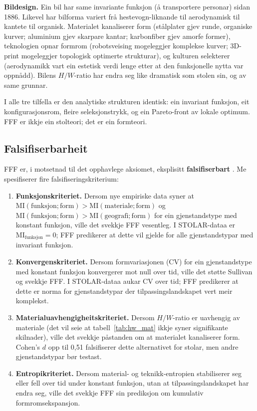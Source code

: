 \documentclass[10pt, a4paper, twocolumn]{article}
\begin{document}
\textbf{Bildesign.} Ein bil har same invariante funksjon (å transportere personar) sidan 1886. Likevel har bilforma variert frå hestevogn-liknande til aerodynamisk til kantete til organisk. Materialet kanaliserer form (stålplater gjev runde, organiske kurver; aluminium gjev skarpare kantar; karbonfiber gjev amorfe former), teknologien opnar formrom (robotsveising mogeleggjer komplekse kurver; 3D-print mogeleggjer topologisk optimerte strukturar), og kulturen selekterer (aerodynamikk vart ein estetisk verdi lenge etter at den funksjonelle nytta var oppnådd). Bilens $H/W$-ratio har endra seg like dramatisk som stolen sin, og av same grunnar.

I alle tre tilfella er den analytiske strukturen identisk: ein invariant funksjon, eit konfigurasjonsrom, fleire seleksjonstrykk, og ein Pareto-front av lokale optimum. FFF er ikkje ein stolteori; det er ein formteori.


\subsection{Falsifiserbarheit}

FFF er, i motsetnad til det opphavlege aksiomet, eksplisitt \textbf{falsifiserbart} \citep{popper1959, kuhn1962}. Me spesifiserer fire falsifiseringskriterium:

\begin{enumerate}
  \item \textbf{Funksjonskriteriet.} Dersom nye empiriske data syner at $\text{MI}(\text{funksjon}; \text{form}) > \text{MI}(\text{materiale}; \text{form})$ og $\text{MI}(\text{funksjon}; \text{form}) > \text{MI}(\text{geografi}; \text{form})$ for ein gjenstandstype med konstant funksjon, ville det svekkje FFF vesentleg. I STOLAR-dataa er $\text{MI}_{\text{funksjon}} = 0$; FFF predikerer at dette vil gjelde for alle gjenstandstypar med invariant funksjon.

  \item \textbf{Konvergenskriteriet.} Dersom formvariasjonen (CV) for ein gjenstandstype med konstant funksjon konvergerer mot null over tid, ville det støtte Sullivan og svekkje FFF. I STOLAR-dataa aukar CV over tid; FFF predikerer at dette er norma for gjenstandstypar der tilpassingslandskapet vert meir komplekst.

  \item \textbf{Materialuavhengigheitskriteriet.} Dersom $H/W$-ratio er uavhengig av materiale (det vil seie at tabell~\ref{tab:hw_mat} ikkje syner signifikante skilnader), ville det svekkje påstanden om at materialet kanaliserer form. Cohen's $d$ opp til 0,51 falsifiserer dette alternativet for stolar, men andre gjenstandstypar bør testast.

  \item \textbf{Entropikriteriet.} Dersom material- og teknikk-entropien stabiliserer seg eller fell over tid under konstant funksjon, utan at tilpassingslandskapet har endra seg, ville det svekkje FFF sin prediksjon om kumulativ formromsekspansjon.
\end{enumerate}
\end{document}
